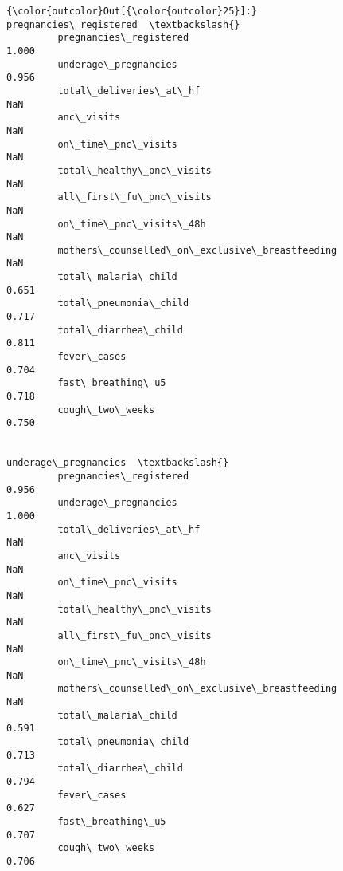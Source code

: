 \documentclass[11pt]{article}
\begin{document}
\begin{Verbatim}[commandchars=\\\{\}]
{\color{outcolor}Out[{\color{outcolor}25}]:}                                                pregnancies\_registered  \textbackslash{}
         pregnancies\_registered                                          1.000   
         underage\_pregnancies                                            0.956   
         total\_deliveries\_at\_hf                                            NaN   
         anc\_visits                                                        NaN   
         on\_time\_pnc\_visits                                                NaN   
         total\_healthy\_pnc\_visits                                          NaN   
         all\_first\_fu\_pnc\_visits                                           NaN   
         on\_time\_pnc\_visits\_48h                                            NaN   
         mothers\_counselled\_on\_exclusive\_breastfeeding                     NaN   
         total\_malaria\_child                                             0.651   
         total\_pneumonia\_child                                           0.717   
         total\_diarrhea\_child                                            0.811   
         fever\_cases                                                     0.704   
         fast\_breathing\_u5                                               0.718   
         cough\_two\_weeks                                                 0.750   
         
                                                        underage\_pregnancies  \textbackslash{}
         pregnancies\_registered                                        0.956   
         underage\_pregnancies                                          1.000   
         total\_deliveries\_at\_hf                                          NaN   
         anc\_visits                                                      NaN   
         on\_time\_pnc\_visits                                              NaN   
         total\_healthy\_pnc\_visits                                        NaN   
         all\_first\_fu\_pnc\_visits                                         NaN   
         on\_time\_pnc\_visits\_48h                                          NaN   
         mothers\_counselled\_on\_exclusive\_breastfeeding                   NaN   
         total\_malaria\_child                                           0.591   
         total\_pneumonia\_child                                         0.713   
         total\_diarrhea\_child                                          0.794   
         fever\_cases                                                   0.627   
         fast\_breathing\_u5                                             0.707   
         cough\_two\_weeks                                               0.706   
         

\end{Verbatim}
\end{document}
